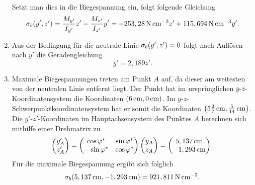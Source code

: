 \documentclass{exercise}
\begin{document}
\begin{enumerate}
\[        \]
        Setzt man dies in die Biegespannung ein, folgt folgende Gleichung
        \[
            \sigma_b\parentheses*{y', z'} = \frac{M_{y'}}{I_{y'}}z' - \frac{M_{z'}}{I_{z'}}y' = -253,28\sis{\newton\per\centi\meter\cubed}z' + 115,694\sis{\newton\per\centi\meter\cubed}y'.
        \]
        \item Aus der Bedingung für die neutrale Linie \(\sigma_b\parentheses*{y', z'} = 0\) folgt nach Auflösen nach \(y'\) die Geradengleichung
        \[
            y' = 2,189z'.
        \]
        \item Maximale Biegespannungen treten am Punkt \(A\) auf, da dieser am weitesten von der neutralen Linie entfernt liegt.
        Der Punkt hat im ursprünglichen \(\bar{y}\)-\(\bar{z}\)-Koordinatensystem die Koordinaten \(\parentheses*{6\sis{\centi\meter}, 0\sis{\centi\meter}}\).
        Im \(y\)-\(z\)-Schwerpunktkoordinatensystem hat er somit die Koordinaten \(\parentheses*{5\frac{2}{7}\sis{\centi\meter}, \frac{5}{14}\sis{\centi\meter}}\).
        Die \(y'\)-\(z'\)-Koordinaten im Hauptachsensystem des Punktes \(A\) berechnen sich mithilfe einer Drehmatrix zu
        \[
            \begin{pmatrix}
                y_A'\\
                z_A'
            \end{pmatrix} = \begin{pmatrix}
                \cos\varphi^* & \sin\varphi^*\\
                -\sin\varphi^* & \cos\varphi^*
            \end{pmatrix}\begin{pmatrix}
                y_A\\
                z_A
            \end{pmatrix} = \begin{pmatrix}
                5,137\sis{\centi\meter}\\
                -1,293\sis{\centi\meter}
            \end{pmatrix}.
        \]
        Für die maximale Biegespannung ergibt sich folglich
        \[
            \sigma_b\parentheses*{5,137\sis{\centi\meter}, -1,293\sis{\centi\meter}} = 921,811\sis{\newton\per\centi\meter\squared}.
        \]
    \end{enumerate}
\end{document}
